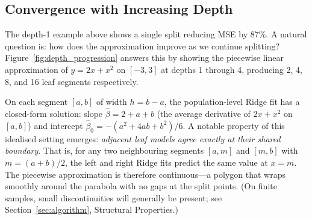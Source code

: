 \documentclass[11pt,a4paper]{article}
\begin{document}
\subsection{Convergence with Increasing Depth}\label{sec:convergence}

The depth-1 example above shows a single split reducing MSE by 87\%. A natural question is: how does the approximation improve as we continue splitting? Figure~\ref{fig:depth_progression} answers this by showing the piecewise linear approximation of $y = 2x + x^2$ on $[-3,3]$ at depths 1 through 4, producing 2, 4, 8, and 16 leaf segments respectively.

On each segment $[a,b]$ of width $h = b - a$, the population-level Ridge fit has a closed-form solution: slope $\hat{\beta} = 2 + a + b$ (the average derivative of $2x + x^2$ on $[a,b]$) and intercept $\hat{\beta}_0 = -(a^2 + 4ab + b^2)/6$. A notable property of this idealised setting emerges: \emph{adjacent leaf models agree exactly at their shared boundary}. That is, for any two neighbouring segments $[a,m]$ and $[m,b]$ with $m = (a+b)/2$, the left and right Ridge fits predict the same value at $x = m$. The piecewise approximation is therefore continuous---a polygon that wraps smoothly around the parabola with no gaps at the split points. (On finite samples, small discontinuities will generally be present; see Section~\ref{sec:algorithm}, Structural Properties.)
\end{document}
